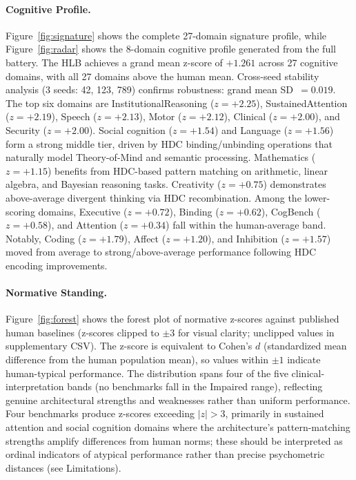 \documentclass[11pt,letterpaper]{article}
\newcommand{\hlb}{\textsc{HLB}}
\begin{document}
\paragraph{Cognitive Profile.} Figure~\ref{fig:signature} shows the complete 27-domain signature profile, while Figure~\ref{fig:radar} shows the 8-domain cognitive profile generated from the full battery. The \hlb{} achieves a grand mean z-score of $+1.261$ across 27 cognitive domains, with all 27 domains above the human mean. Cross-seed stability analysis (3 seeds: 42, 123, 789) confirms robustness: grand mean SD~$= 0.019$. The top six domains are InstitutionalReasoning ($z = +2.25$), SustainedAttention ($z = +2.19$), Speech ($z = +2.13$), Motor ($z = +2.12$), Clinical ($z = +2.00$), and Security ($z = +2.00$). Social cognition ($z = +1.54$) and Language ($z = +1.56$) form a strong middle tier, driven by HDC binding/unbinding operations that naturally model Theory-of-Mind and semantic processing. Mathematics ($z = +1.15$) benefits from HDC-based pattern matching on arithmetic, linear algebra, and Bayesian reasoning tasks. Creativity ($z = +0.75$) demonstrates above-average divergent thinking via HDC recombination. Among the lower-scoring domains, Executive ($z = +0.72$), Binding ($z = +0.62$), CogBench ($z = +0.58$), and Attention ($z = +0.34$) fall within the human-average band. Notably, Coding ($z = +1.79$), Affect ($z = +1.20$), and Inhibition ($z = +1.57$) moved from average to strong/above-average performance following HDC encoding improvements.

\paragraph{Normative Standing.} Figure~\ref{fig:forest} shows the forest plot of normative z-scores against published human baselines (z-scores clipped to $\pm 3$ for visual clarity; unclipped values in supplementary CSV). The z-score is equivalent to Cohen's $d$ (standardized mean difference from the human population mean), so values within $\pm 1$ indicate human-typical performance. The distribution spans four of the five clinical-interpretation bands (no benchmarks fall in the Impaired range), reflecting genuine architectural strengths and weaknesses rather than uniform performance. Four benchmarks produce z-scores exceeding $|z| > 3$, primarily in sustained attention and social cognition domains where the architecture's pattern-matching strengths amplify differences from human norms; these should be interpreted as ordinal indicators of atypical performance rather than precise psychometric distances (see Limitations).
\end{document}
